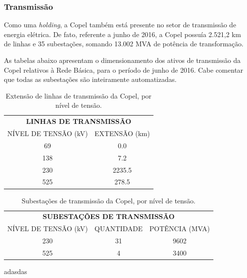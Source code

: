 \documentclass[aprovado,numbers]{coppe}
\begin{document}
  \hypertarget{transmissuxe3o}{%
  \subsubsection{Transmissão}\label{transmissuxe3o}}

  Como uma \emph{holding}, a Copel também está presente no setor de transmissão de energia elétrica. De fato, referente a junho de 2016, a Copel possuía 2.521,2 km de linhas e 35 subestações, somando 13.002 MVA de potência de transformação.

  As tabelas abaixo apresentam o dimensionamento dos ativos de transmissão da Copel relativos à Rede Básica, para o período de junho de 2016. Cabe comentar que todas as subestações são inteiramente automatizadas.
  \begin{table}

  \caption{\label{tab:unnamed-chunk-3}Extensão de linhas de transmissão da Copel, por nível de tensão.}
  \centering
  \begin{tabular}[t]{cc}
  \toprule
  \multicolumn{2}{c}{\textbf{LINHAS DE TRANSMISSÃO}} \\
  \cmidrule(l{3pt}r{3pt}){1-2}
  NÍVEL DE TENSÃO (kV) & EXTENSÃO (km)\\
  \midrule
  69 & 0.0\\
  138 & 7.2\\
  230 & 2235.5\\
  525 & 278.5\\
  \bottomrule
  \end{tabular}
  \end{table}
  \begin{table}

  \caption{\label{tab:unnamed-chunk-4}Subestações de transmissão da Copel, por nível de tensão.}
  \centering
  \begin{tabular}[t]{ccc}
  \toprule
  \multicolumn{3}{c}{\textbf{SUBESTAÇÕES DE TRANSMISSÃO}} \\
  \cmidrule(l{3pt}r{3pt}){1-3}
  NÍVEL DE TENSÃO (kV) & QUANTIDADE & POTÊNCIA (MVA)\\
  \midrule
  230 & 31 & 9602\\
  525 & 4 & 3400\\
  \bottomrule
  \end{tabular}
  \end{table}
  adasdas
\end{document}
